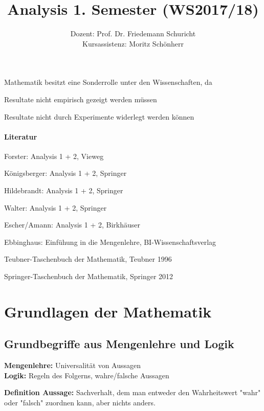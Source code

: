 \documentclass[11pt]{article}
\title{\textbf{Analysis 1. Semester (WS2017/18)}}
\author{Dozent: Prof. Dr. Friedemann Schuricht\\
		Kursassistenz: Moritz Sch\"onherr}
\date{}
\begin{document}
\maketitle

\raggedright 
Mathematik besitzt eine Sonderrolle unter den Wissenschaften, da
\begin{compactitem}
	\item Resultate nicht empirisch gezeigt werden m\"ussen
	\item Resultate nicht durch Experimente widerlegt werden k\"onnen
\end{compactitem}

\paragraph{Literatur}
\begin{compactitem}
	\item Forster: Analysis 1 + 2, Vieweg
	\item K\"onigsberger: Analysis 1 + 2, Springer
	\item Hildebrandt: Analysis 1 + 2, Springer
	\item Walter: Analysis 1 + 2, Springer
	\item Escher/Amann: Analysis 1 + 2, Birkh\"auser
	\item Ebbinghaus: Einf\"uhung in die Mengenlehre, BI-Wissenschaftsverlag
	\item Teubner-Taschenbuch der Mathematik, Teubner 1996
	\item Springer-Taschenbuch der Mathematik, Springer 2012
\end{compactitem}

\section{Grundlagen der Mathematik}

	\subsection{Grundbegriffe aus Mengenlehre und Logik}

		\textbf{Mengenlehre:} Universalit\"at von Aussagen \\
		\textbf{Logik:} Regeln des Folgerns, wahre/falsche Aussagen

		\begin{framed}
			\textbf{Definition Aussage:} Sachverhalt, dem man entweder den Wahrheitswert "wahr" oder "falsch" 				zuordnen kann, aber nichts anders.
		\end{framed}
\end{document}

